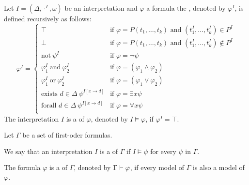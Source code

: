 \begin{definition}
Let $I=(\Delta,\cdot^I,\omega)$ be an interpretation and $\varphi$ a formula the , denoted by $\varphi^I$, is defined recursively as follows:
\[\varphi^I=
\begin{cases}
\top & \text{if $\varphi=P(t_1,\dots,t_k)$ and $(t^I_1,\dots,t^I_k)\in P^I$}\\
\bot & \text{if $\varphi=P(t_1,\dots,t_k)$ and $(t^I_1,\dots,t^I_k)\notin P^I$}\\
\text{not}~\psi^I & \text{if $\varphi=\neg\psi$}\\
\varphi^I_1~\text{and}~\varphi^I_2 & \text{if $\varphi=(\varphi_1\wedge\varphi_2)$}\\
\varphi^I_1~\text{or}~\varphi^I_2 & \text{if $\varphi=(\varphi_1\vee\varphi_2)$}\\
\text{exists $d\in\Delta$}~\psi^{I\left[x\to d\right]} & \text{if $\varphi=\exists x\psi$}\\
\text{forall $d\in\Delta$}~\psi^{I\left[x\to d\right]} & \text{if $\varphi=\forall x\psi$}\\
\end{cases}\]
The interpretation $I$ is a  of $\varphi$, denoted by $I\models\varphi$, if $\varphi^I=\top$.
\end{definition}
\begin{definition}
Let $\Gamma$ be a set of first-oder formulas.
\begin{description}
\item We say that an interpretation $I$ is a  of $\Gamma$ if $I\models\psi$ for every $\psi$ in $\Gamma$.
\item The formula $\varphi$ is a  of $\Gamma$, denoted by $\Gamma\vdash\varphi$, if every model of $\Gamma$ is also a model of $\varphi$.
\end{description}
\end{definition}